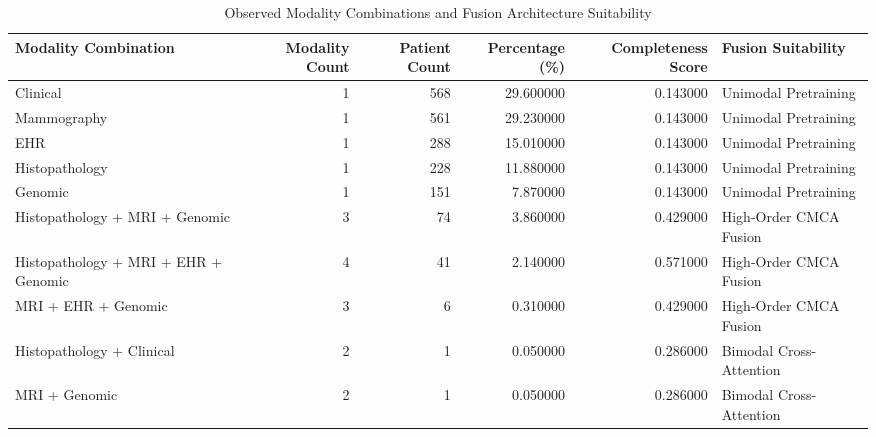 \begin{table}
\caption{Observed Modality Combinations and Fusion Architecture Suitability}
\label{tab:table_p2_modality_combinations}
\begin{tabular}{lrrrrl}
\toprule
Modality Combination & Modality Count & Patient Count & Percentage (\%) & Completeness Score & Fusion Suitability \\
\midrule
Clinical & 1 & 568 & 29.600000 & 0.143000 & Unimodal Pretraining \\
Mammography & 1 & 561 & 29.230000 & 0.143000 & Unimodal Pretraining \\
EHR & 1 & 288 & 15.010000 & 0.143000 & Unimodal Pretraining \\
Histopathology & 1 & 228 & 11.880000 & 0.143000 & Unimodal Pretraining \\
Genomic & 1 & 151 & 7.870000 & 0.143000 & Unimodal Pretraining \\
Histopathology + MRI + Genomic & 3 & 74 & 3.860000 & 0.429000 & High-Order CMCA Fusion \\
Histopathology + MRI + EHR + Genomic & 4 & 41 & 2.140000 & 0.571000 & High-Order CMCA Fusion \\
MRI + EHR + Genomic & 3 & 6 & 0.310000 & 0.429000 & High-Order CMCA Fusion \\
Histopathology + Clinical & 2 & 1 & 0.050000 & 0.286000 & Bimodal Cross-Attention \\
MRI + Genomic & 2 & 1 & 0.050000 & 0.286000 & Bimodal Cross-Attention \\
\bottomrule
\end{tabular}
\end{table}
